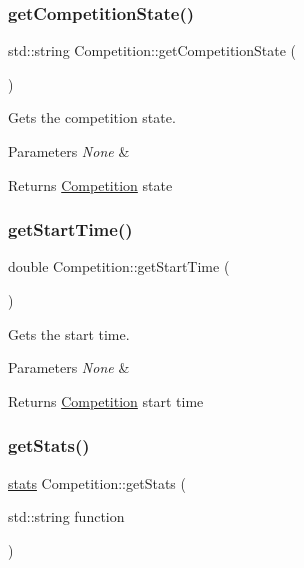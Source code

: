 \subsubsection{\texorpdfstring{get\+Competition\+State()}{getCompetitionState()}}
{\footnotesize\ttfamily std\+::string Competition\+::get\+Competition\+State (\begin{DoxyParamCaption}{ }\end{DoxyParamCaption})}



Gets the competition state. 


\begin{DoxyParams}{Parameters}
{\em None} & \\
\hline
\end{DoxyParams}
\begin{DoxyReturn}{Returns}
\hyperlink{classCompetition}{Competition} state 
\end{DoxyReturn}
\mbox{\label{classCompetition_a9c8b79a8c4a7bcc5eaa77a327df3f98a}} 
\subsubsection{\texorpdfstring{get\+Start\+Time()}{getStartTime()}}
{\footnotesize\ttfamily double Competition\+::get\+Start\+Time (\begin{DoxyParamCaption}{ }\end{DoxyParamCaption})}



Gets the start time. 


\begin{DoxyParams}{Parameters}
{\em None} & \\
\hline
\end{DoxyParams}
\begin{DoxyReturn}{Returns}
\hyperlink{classCompetition}{Competition} start time 
\end{DoxyReturn}
\mbox{\label{classCompetition_acb4ec20a6365fbb922bd20fc3509ddf8}} 
\subsubsection{\texorpdfstring{get\+Stats()}{getStats()}}
{\footnotesize\ttfamily \hyperlink{utils_8h_abd807f196b951c0cdd24d50164d54763}{stats} Competition\+::get\+Stats (\begin{DoxyParamCaption}\item[{std\+::string}]{function }\end{DoxyParamCaption})}



